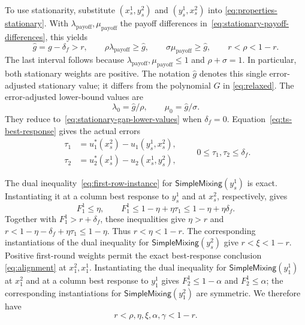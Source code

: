 \documentclass[11pt]{article}
\theoremstyle{remark}
\theoremstyle{plain}
\newcommand{\sm}{\mathsf{SimpleMixing}}
\begin{document}
To use stationarity, substitute $(x_s^1,y_s^2)$ and
$(y_s^1,x_s^2)$ into \eqref{eq:properties-stationary}.
With $\lambda_{\mathrm{payoff}},\mu_{\mathrm{payoff}}$ the payoff differences in~\eqref{eq:stationary-payoff-differences}, this yields
\begin{equation}
 \hat g=g-\delta_f>r,\qquad
 \rho\lambda_{\mathrm{payoff}}\ge \hat g,\qquad \sigma\mu_{\mathrm{payoff}}\ge \hat g,
 \qquad r<\rho<1-r.
 \label{eq:finite-error-stationary-value}
\end{equation}
The last interval follows because $\lambda_{\mathrm{payoff}},\mu_{\mathrm{payoff}}\le1$ and
$\rho+\sigma=1$. In particular, both stationary weights are positive.
The notation $\hat g$ denotes this single error-adjusted stationary
value; it differs from the polynomial $G$ in \eqref{eq:relaxed}.
The error-adjusted lower-bound values are
\begin{equation}
 \lambda_0=\hat g/\rho,\qquad \mu_0=\hat g/\sigma.
 \label{eq:finite-error-gap-lower-values}
\end{equation}
They reduce to~\eqref{eq:stationary-gap-lower-values} when
$\delta_f=0$.
Equation~\eqref{eq:ts-best-response} gives the actual errors
\begin{equation}
 \begin{aligned}
 \tau_1&=u_1^*(x_s^2)-u_1(y_s^1,x_s^2),\\
 \tau_2&=u_2^*(x_s^1)-u_2(x_s^1,y_s^2),
 \end{aligned}
 \qquad 0\le\tau_1,\tau_2\le\delta_f.
 \label{eq:finite-error-best-responses}
\end{equation}

The dual inequality~\eqref{eq:first-row-instance} for
$\sm(y_s^1)$ is exact. Instantiating it at a column best response
to $y_s^1$ and at $x_s^2$, respectively, gives
\begin{equation}
 F_1^1\le\eta,\qquad
 F_1^1\le1-\eta+\eta\tau_1\le1-\eta+\eta\delta_f.
 \label{eq:finite-error-first-weight}
\end{equation}
Together with $F_1^1>r+\delta_f$, these inequalities give
$\eta>r$ and
$r<1-\eta-\delta_f+\eta\tau_1\le1-\eta$.
Thus $r<\eta<1-r$. The corresponding instantiations of the
dual inequality for $\sm(y_s^2)$ give $r<\xi<1-r$.
Positive first-round weights permit the exact best-response
conclusion \eqref{eq:alignment} at $x_1^2,x_1^1$.
Instantiating the dual inequality for $\sm(y_1^1)$ at $x_1^2$
and at a column best response to $y_1^1$ gives
$F_2^1\le1-\alpha$ and $F_2^1\le\alpha$; the corresponding
instantiations for $\sm(y_1^2)$ are symmetric. We therefore have
\begin{equation}
 r<\rho,\eta,\xi,\alpha,\gamma<1-r.
 \label{eq:finite-error-weight-ranges}
\end{equation}
\end{document}
